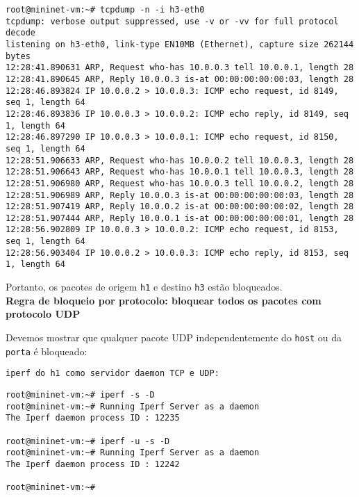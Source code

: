\documentclass[12pt,letterpaper]{article}
\begin{document}
\begin{tiny}
\begin{verbatim}
root@mininet-vm:~# tcpdump -n -i h3-eth0
tcpdump: verbose output suppressed, use -v or -vv for full protocol decode
listening on h3-eth0, link-type EN10MB (Ethernet), capture size 262144 bytes
12:28:41.890631 ARP, Request who-has 10.0.0.3 tell 10.0.0.1, length 28
12:28:41.890645 ARP, Reply 10.0.0.3 is-at 00:00:00:00:00:03, length 28
12:28:46.893824 IP 10.0.0.2 > 10.0.0.3: ICMP echo request, id 8149, seq 1, length 64
12:28:46.893836 IP 10.0.0.3 > 10.0.0.2: ICMP echo reply, id 8149, seq 1, length 64
12:28:46.897290 IP 10.0.0.3 > 10.0.0.1: ICMP echo request, id 8150, seq 1, length 64
12:28:51.906633 ARP, Request who-has 10.0.0.2 tell 10.0.0.3, length 28
12:28:51.906643 ARP, Request who-has 10.0.0.1 tell 10.0.0.3, length 28
12:28:51.906980 ARP, Request who-has 10.0.0.3 tell 10.0.0.2, length 28
12:28:51.906989 ARP, Reply 10.0.0.3 is-at 00:00:00:00:00:03, length 28
12:28:51.907419 ARP, Reply 10.0.0.2 is-at 00:00:00:00:00:02, length 28
12:28:51.907444 ARP, Reply 10.0.0.1 is-at 00:00:00:00:00:01, length 28
12:28:56.902809 IP 10.0.0.3 > 10.0.0.2: ICMP echo request, id 8153, seq 1, length 64
12:28:56.903404 IP 10.0.0.2 > 10.0.0.3: ICMP echo reply, id 8153, seq 1, length 64
\end{verbatim}
\end{tiny}

Portanto, os pacotes de origem \texttt{h1} e destino \texttt{h3} estão bloqueados.\\

\textbf{Regra de bloqueio por protocolo: bloquear todos os pacotes com protocolo UDP}

Devemos mostrar que qualquer pacote UDP independentemente do \texttt{host} ou da \texttt{porta} é bloqueado:

\begin{verbatim}
iperf do h1 como servidor daemon TCP e UDP:
\end{verbatim}

\begin{tiny}
\begin{verbatim}
root@mininet-vm:~# iperf -s -D
root@mininet-vm:~# Running Iperf Server as a daemon
The Iperf daemon process ID : 12235

root@mininet-vm:~# iperf -u -s -D
root@mininet-vm:~# Running Iperf Server as a daemon
The Iperf daemon process ID : 12242

root@mininet-vm:~# 
\end{verbatim}
\end{tiny}
\end{document}

